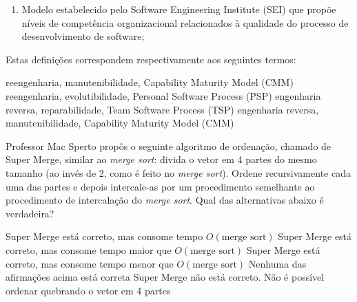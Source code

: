 \documentclass[12pt, addpoints]{exam}
\begin{document}
\begin{questions}
\begin{enumerate}[label=\Roman*.]
    \item Modelo estabelecido pelo Software Engineering Institute (SEI) que propõe níveis de competência organizacional relacionados à qualidade do processo de desenvolvimento de software;

\end{enumerate}

Estas definições correspondem respectivamente aos seguintes termos:
\begin{choices}
\choice reengenharia, manutenibilidade, Capability Maturity Model (CMM)
\choice reengenharia, evolutibilidade, Personal Software Process (PSP)
\choice engenharia reversa, reparabilidade, Team Software Process (TSP)
\choice engenharia reversa, manutenibilidade, Capability Maturity Model (CMM)
\end{choices}

\question

Professor Mac Sperto propôs o seguinte algoritmo de ordenação, chamado de Super Merge, similar ao \textit{merge sort}: divida o vetor em 4 partes do mesmo tamanho (ao invés de 2, como é feito no \textit{merge sort}). Ordene recursivamente cada uma das partes e depois intercale-as por um procedimento semelhante ao procedimento de intercalação do \textit{merge sort}. Qual das alternativas abaixo é verdadeira?
\begin{choices}
\choice Super Merge está correto, mas consome tempo \( O(\text{merge sort}) \)
\choice Super Merge está correto, mas consome tempo maior que \( O(\text{merge sort}) \)
\choice Super Merge está correto, mas consome tempo menor que \( O(\text{merge sort}) \)
\choice Nenhuma das afirmações acima está correta
\choice Super Merge não está correto. Não é possível ordenar quebrando o vetor em 4 partes
\end{choices}



    \end{questions}
    
\end{document}
